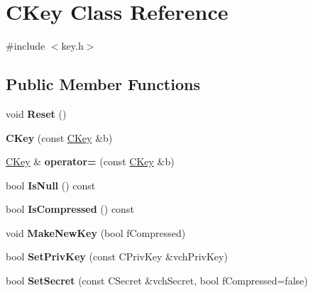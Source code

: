 \hypertarget{class_c_key}{}\section{C\+Key Class Reference}
\label{class_c_key}


{\ttfamily \#include $<$key.\+h$>$}

\subsection*{Public Member Functions}
\begin{DoxyCompactItemize}
\item 
\mbox{\label{class_c_key_a99856683e0e4ca1953671bb7fd6047b9}} 
void {\bfseries Reset} ()
\item 
\mbox{\label{class_c_key_a1a9b47d12e534954212efbbb4b166cdd}} 
{\bfseries C\+Key} (const \mbox{\hyperlink{class_c_key}{C\+Key}} \&b)
\item 
\mbox{\label{class_c_key_a5a1225c0c8e1faca60b951dc56cf0cad}} 
\mbox{\hyperlink{class_c_key}{C\+Key}} \& {\bfseries operator=} (const \mbox{\hyperlink{class_c_key}{C\+Key}} \&b)
\item 
\mbox{\label{class_c_key_a05f11e652e8281d17314f11f5e54b0b3}} 
bool {\bfseries Is\+Null} () const
\item 
\mbox{\label{class_c_key_a96b017433a65335775cf3807d73f85ce}} 
bool {\bfseries Is\+Compressed} () const
\item 
\mbox{\label{class_c_key_a9d12ed9d297e4286250fd7ea6b59e1a5}} 
void {\bfseries Make\+New\+Key} (bool f\+Compressed)
\item 
\mbox{\label{class_c_key_a4f5fd24b068dbbe49a0f9e28d69fef5d}} 
bool {\bfseries Set\+Priv\+Key} (const C\+Priv\+Key \&vch\+Priv\+Key)
\item 
\mbox{\label{class_c_key_aac56b1d1732cc88ebde08c6fed6b1cfd}} 
bool {\bfseries Set\+Secret} (const C\+Secret \&vch\+Secret, bool f\+Compressed=false)
\item 
\mbox{\label{class_c_key_a10fe8f3c2a97f7402120ec1f9beca3dd}} 

\end{DoxyCompactItemize}
